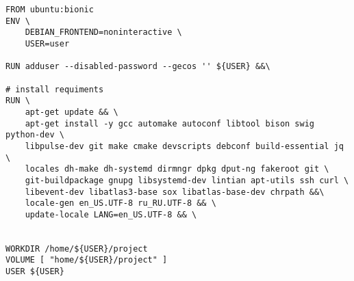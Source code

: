 
\begin{lstlisting}[caption={\texttt{Dockerfile}}, label={docker:image}]
FROM ubuntu:bionic
ENV \
    DEBIAN_FRONTEND=noninteractive \
    USER=user

RUN adduser --disabled-password --gecos '' ${USER} &&\

# install requiments
RUN \
    apt-get update && \
    apt-get install -y gcc automake autoconf libtool bison swig python-dev \
    libpulse-dev git make cmake devscripts debconf build-essential jq \
    locales dh-make dh-systemd dirmngr dpkg dput-ng fakeroot git \
    git-buildpackage gnupg libsystemd-dev lintian apt-utils ssh curl \
    libevent-dev libatlas3-base sox libatlas-base-dev chrpath &&\
    locale-gen en_US.UTF-8 ru_RU.UTF-8 && \
    update-locale LANG=en_US.UTF-8 && \


WORKDIR /home/${USER}/project
VOLUME [ "home/${USER}/project" ]
USER ${USER}
\end{lstlisting}
